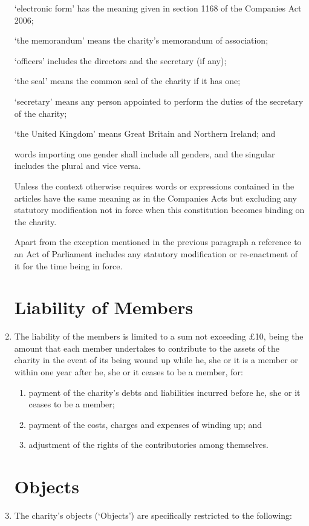 \documentclass{article}
\begin{document}
\begin{enumerate}[label=\arabic*]
    ‘electronic form’ has the meaning given in section 1168 of the
    Companies Act 2006;
    
    ‘the memorandum’ means the charity’s memorandum of association;
    
    ‘officers’ includes the directors and the secretary (if any);
    
    ‘the seal’ means the common seal of the charity if it has one;
    
    ‘secretary’ means any person appointed to perform the duties of the
    secretary of the charity;
    
    ‘the United Kingdom’ means Great Britain and Northern Ireland; and
    
    words importing one gender shall include all genders, and the singular
    includes the plural and vice versa.
    
    Unless the context otherwise requires words or expressions contained
    in the articles have the same meaning as in the Companies Acts but
    excluding any statutory modification not in force when this constitution
    becomes binding on the charity.
    
    Apart from the exception mentioned in the previous paragraph a
    reference to an Act of Parliament includes any statutory modification or
    re-enactment of it for the time being in force.
    \section{Liability of Members}
    \item The liability of the members is limited to a sum not exceeding £10,
    being the amount that each member undertakes to contribute to the
    assets of the charity in the event of its being wound up while he, she
    or it is a member or within one year after he, she or it ceases to be a
    member, for:
    \begin{enumerate}[label=(\arabic*)]
        \item payment of the charity’s debts and liabilities incurred before he,
        she or it ceases to be a member;
        \item payment of the costs, charges and expenses of winding up; and
        \item adjustment of the rights of the contributories among themselves.
    \end{enumerate} 
    
    \section{Objects}
    \item The charity’s objects (‘Objects’) are specifically restricted to
    the following:
    

\end{enumerate}
\end{document}
